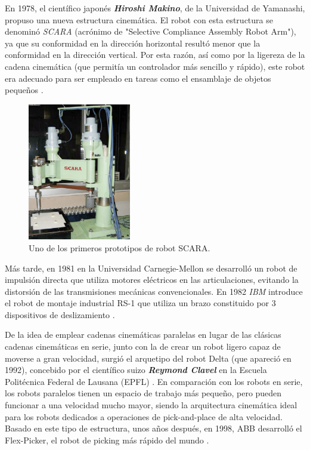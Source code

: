 \begin{itemize}
  En 1978, el científico japonés \textbf{\emph{Hiroshi Makino}}, de la Universidad de Yamanashi, propuso una nueva estructura cinemática. El robot con esta estructura se denominó \emph{SCARA} (acrónimo de "Selective Compliance Assembly Robot Arm"), ya que su conformidad en la dirección horizontal resultó menor que la conformidad en la dirección vertical. Por esta razón, así como por la ligereza de la cadena cinemática (que permitía un controlador más sencillo y rápido), este robot era adecuado para ser empleado en tareas como el ensamblaje de objetos pequeños \cite{Makino80}.
  
  \begin{figure} [h!]
    \begin{center}
      \includegraphics[width=45mm]{figs/Scara.png}
    \end{center}
    \caption{Uno de los primeros prototipos de robot SCARA.}
    \label{fig:Scara}
  \end{figure}
  
  Más tarde, en 1981 en la Universidad Carnegie-Mellon se desarrolló un robot de impulsión directa que utiliza motores eléctricos en las articulaciones, evitando la distorsión de las transmisiones mecánicas convencionales. En 1982 \emph{IBM} introduce el robot de montaje industrial RS-1 que utiliza un brazo constituido por 3 dispositivos de deslizamiento \cite{Sanchez07b}.
  
  De la idea de emplear cadenas cinemáticas paralelas en lugar de las clásicas cadenas cinemáticas en serie, junto con la de crear un robot ligero capaz de moverse a gran velocidad, surgió el arquetipo del robot Delta (que apareció en 1992), concebido por el científico suizo \textbf{\emph{Reymond Clavel}} en la Escuela Politécnica Federal de Lausana (EPFL) \cite{Clavel91}. En comparación con los robots en serie, los robots paralelos tienen un espacio de trabajo más pequeño, pero pueden funcionar a una velocidad mucho mayor, siendo la arquitectura cinemática ideal para los robots dedicados a operaciones de pick-and-place de alta velocidad. Basado en este tipo de estructura, unos años después, en 1998, ABB desarrolló el Flex-Picker, el robot de picking más rápido del mundo \cite{Gasparetto19}.
  

\end{itemize}
